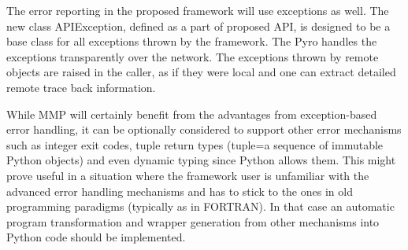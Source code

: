 \documentclass[a4paper,11pt]{article}
\begin{document}
The error reporting in the proposed framework will use exceptions as well. The new class APIException, defined as a part of proposed API, is designed to be a base class for all exceptions thrown by the framework. The Pyro handles the exceptions transparently over the network. The exceptions thrown by remote objects are raised in the caller, as if they were local and one can extract detailed remote trace back information.

While MMP will certainly benefit from the advantages from exception-based error handling, it can be optionally considered to support other error mechanisms such as integer exit codes, tuple return types (tuple=a sequence of immutable Python objects) and even dynamic typing since Python allows them. This might prove useful in a situation where the framework user is unfamiliar with the advanced error handling mechanisms and has to stick to the ones in old programming paradigms (typically as in FORTRAN). In that case an automatic program transformation and wrapper generation from other mechanisms into Python code should be implemented. 




\end{document}
